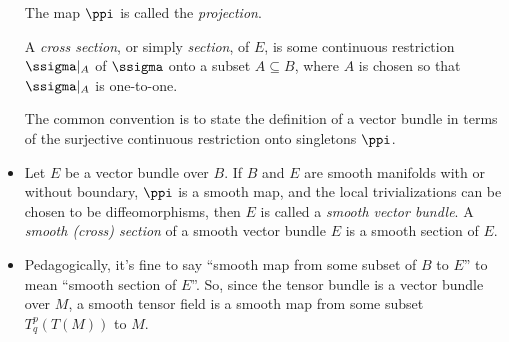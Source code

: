 \begin{itemize}
    The map $\ppi$ is called the \textit{projection}.

    A \textit{cross section}, or simply \textit{section}, of $E$, is some continuous restriction $\ssigma|_A$ of $\ssigma$ onto a subset $A \subseteq B$, where $A$ is chosen so that $\ssigma|_A$ is one-to-one. 
    
    The common convention is to state the definition of a vector bundle in terms of the surjective continuous restriction onto singletons $\ppi$.
    
    \item Let $E$ be a vector bundle over $B$. If $B$ and $E$ are smooth manifolds with or without boundary, $\ppi$ is a smooth map, and the local trivializations can be chosen to be diffeomorphisms, then $E$ is called a \textit{smooth vector bundle}. A \textit{smooth (cross) section} of a smooth vector bundle $E$ is a smooth section of $E$.
    
    \item Pedagogically, it's fine to say ``smooth map from some subset of $B$ to $E$'' to mean ``smooth section of $E$''. So, since the tensor bundle is a vector bundle over $M$, a smooth tensor field is a smooth map from some subset $T^p_q(T(M))$ to $M$.
\end{itemize}